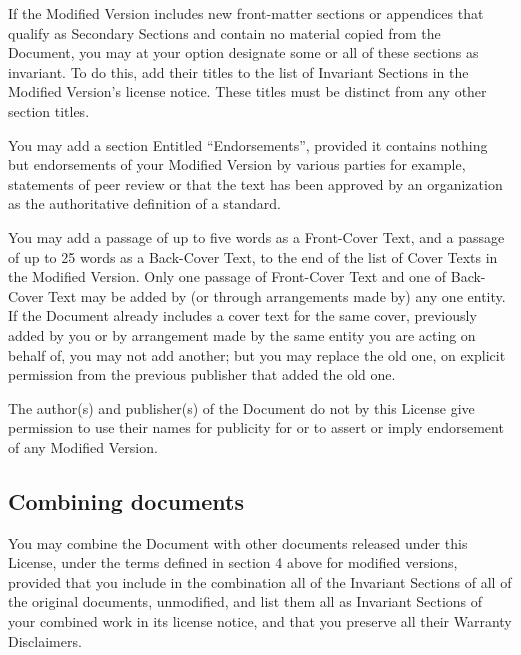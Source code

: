 {\tiny{}If the Modified Version includes new front-matter sections
or appendices that qualify as Secondary Sections and contain no material
copied from the Document, you may at your option designate some or
all of these sections as invariant. To do this, add their titles to
the list of Invariant Sections in the Modified Version's license notice.
These titles must be distinct from any other section titles.}{\tiny\par}

{\tiny{}You may add a section Entitled ``Endorsements'', provided
it contains nothing but endorsements of your Modified Version by various
parties \textemdash{} for example, statements of peer review or that
the text has been approved by an organization as the authoritative
definition of a standard.}{\tiny\par}

{\tiny{}You may add a passage of up to five words as a Front-Cover
Text, and a passage of up to 25 words as a Back-Cover Text, to the
end of the list of Cover Texts in the Modified Version. Only one passage
of Front-Cover Text and one of Back-Cover Text may be added by (or
through arrangements made by) any one entity. If the Document already
includes a cover text for the same cover, previously added by you
or by arrangement made by the same entity you are acting on behalf
of, you may not add another; but you may replace the old one, on explicit
permission from the previous publisher that added the old one.}{\tiny\par}

{\tiny{}The author(s) and publisher(s) of the Document do not by this
License give permission to use their names for publicity for or to
assert or imply endorsement of any Modified Version.}{\tiny\par}

\subsection*{{\tiny{}Combining documents}}

{\tiny{}You may combine the Document with other documents released
under this License, under the terms defined in section 4 above for
modified versions, provided that you include in the combination all
of the Invariant Sections of all of the original documents, unmodified,
and list them all as Invariant Sections of your combined work in its
license notice, and that you preserve all their Warranty Disclaimers.}{\tiny\par}

